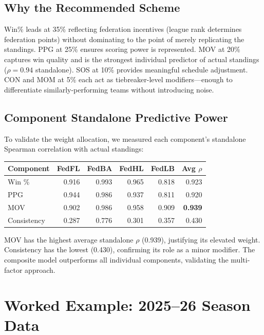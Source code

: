\documentclass[11pt,a4paper]{article}
\begin{document}
\subsection{Why the Recommended Scheme}

Win\% leads at 35\% reflecting federation incentives (league rank determines federation points) without dominating to the point of merely replicating the standings. PPG at 25\% ensures scoring power is represented. MOV at 20\% captures win quality and is the strongest individual predictor of actual standings ($\rho = 0.94$ standalone). SOS at 10\% provides meaningful schedule adjustment. CON and MOM at 5\% each act as tiebreaker-level modifiers---enough to differentiate similarly-performing teams without introducing noise.

\subsection{Component Standalone Predictive Power}

To validate the weight allocation, we measured each component's standalone Spearman correlation with actual standings:

\begin{table}[H]
\centering
\begin{tabular}{@{}lrrrrr@{}}
\toprule
\textbf{Component} & \textbf{FedFL} & \textbf{FedBA} & \textbf{FedHL} & \textbf{FedLB} & \textbf{Avg $\rho$}\\
\midrule
Win \% & 0.916 & 0.993 & 0.965 & 0.818 & 0.923\\
PPG & 0.944 & 0.986 & 0.937 & 0.811 & 0.920\\
MOV & 0.902 & 0.986 & 0.958 & 0.909 & \textbf{0.939}\\
Consistency & 0.287 & 0.776 & 0.301 & 0.357 & 0.430\\
\bottomrule
\end{tabular}
\end{table}

MOV has the highest average standalone $\rho$ (0.939), justifying its elevated weight. Consistency has the lowest (0.430), confirming its role as a minor modifier. The composite model outperforms all individual components, validating the multi-factor approach.


\section{Worked Example: 2025--26 Season Data}
\end{document}
